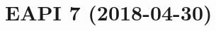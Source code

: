 \documentclass[a4paper,nofoldmark]{leaflet}
\newcommand{\code}[1]{\texttt{#1}}
\newcommand{\featureref}[1]{\textsc{#1} on page~\pageref{feat:#1}}
\begin{document}

\section{EAPI 7 (2018-04-30)}
\label{sec:cs:eapi7}
\end{document}
